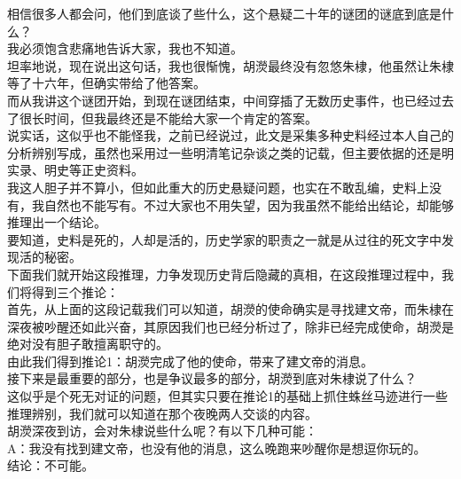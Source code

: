 \begin{multicols}{\theparacolNo}
相信很多人都会问，他们到底谈了些什么，这个悬疑二十年的谜团的谜底到底是什么？\\

我必须饱含悲痛地告诉大家，我也不知道。\\

坦率地说，现在说出这句话，我也很惭愧，胡濙最终没有忽悠朱棣，他虽然让朱棣等了十六年，但确实带给了他答案。\\

而从我讲这个谜团开始，到现在谜团结束，中间穿插了无数历史事件，也已经过去了很长时间，但我最终还是不能给大家一个肯定的答案。\\

说实话，这似乎也不能怪我，之前已经说过，此文是采集多种史料经过本人自己的分析辨别写成，虽然也采用过一些明清笔记杂谈之类的记载，但主要依据的还是明实录、明史等正史资料。\\

我这人胆子并不算小，但如此重大的历史悬疑问题，也实在不敢乱编，史料上没有，我自然也不能写有。不过大家也不用失望，因为我虽然不能给出结论，却能够推理出一个结论。\\

要知道，史料是死的，人却是活的，历史学家的职责之一就是从过往的死文字中发现活的秘密。\\

下面我们就开始这段推理，力争发现历史背后隐藏的真相，在这段推理过程中，我们将得到三个推论：\\

首先，从上面的这段记载我们可以知道，胡濙的使命确实是寻找建文帝，而朱棣在深夜被吵醒还如此兴奋，其原因我们也已经分析过了，除非已经完成使命，胡濙是绝对没有胆子敢擅离职守的。\\

由此我们得到推论1：胡濙完成了他的使命，带来了建文帝的消息。\\

接下来是最重要的部分，也是争议最多的部分，胡濙到底对朱棣说了什么？\\

这似乎是个死无对证的问题，但其实只要在推论1的基础上抓住蛛丝马迹进行一些推理辨别，我们就可以知道在那个夜晚两人交谈的内容。\\

胡濙深夜到访，会对朱棣说些什么呢？有以下几种可能：\\

A：我没有找到建文帝，也没有他的消息，这么晚跑来吵醒你是想逗你玩的。\\

结论：不可能。\\


\end{multicols}
